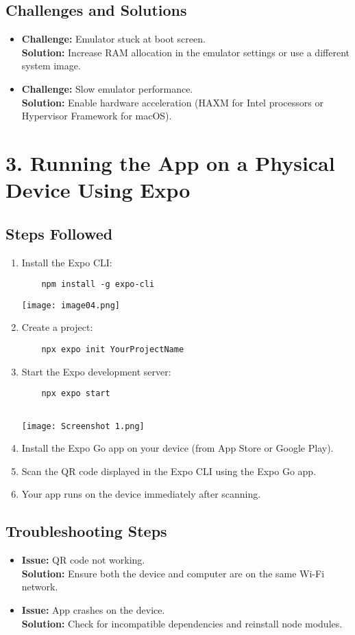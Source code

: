 \documentclass[12pt]{article}
\begin{document}
\subsection*{Challenges and Solutions}
\begin{itemize}
    \item \textbf{Challenge:} Emulator stuck at boot screen.\\
    \textbf{Solution:} Increase RAM allocation in the emulator settings or use a different system image.
    \item \textbf{Challenge:} Slow emulator performance.\\
    \textbf{Solution:} Enable hardware acceleration (HAXM for Intel processors or Hypervisor Framework for macOS).
\end{itemize}

\section*{3. Running the App on a Physical Device Using Expo}
\subsection*{Steps Followed}
\begin{enumerate}
    \item Install the Expo CLI:
    \begin{verbatim}
    npm install -g expo-cli
    \end{verbatim}
    \texttt{[image: image04.png]}
    \item Create a project:
    \begin{verbatim}
    npx expo init YourProjectName
    \end{verbatim}
    \item Start the Expo development server:
    \begin{verbatim}
    npx expo start
    
    \end{verbatim}
    \texttt{[image: Screenshot 1.png]}
    \item Install the Expo Go app on your device (from App Store or Google Play).
    \item Scan the QR code displayed in the Expo CLI using the Expo Go app.
    \item Your app runs on the device immediately after scanning.
\end{enumerate}

 
\subsection*{Troubleshooting Steps}
\begin{itemize}
    \item \textbf{Issue:} QR code not working.\\
    \textbf{Solution:} Ensure both the device and computer are on the same Wi-Fi network.
    \item \textbf{Issue:} App crashes on the device.\\
    \textbf{Solution:} Check for incompatible dependencies and reinstall node modules.
\end{itemize}
\end{document}
